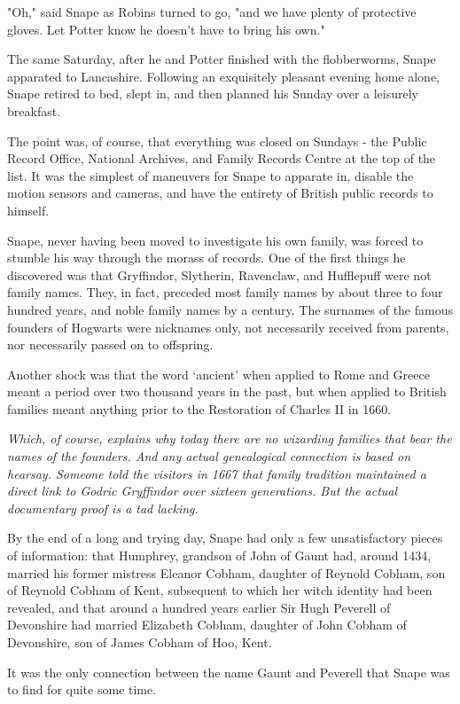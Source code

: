\documentclass[a4paper,11pt]{article}
\begin{document}
"Oh," said Snape as Robins turned to go, "and we have plenty of protective gloves. Let Potter know he doesn't have to bring his own."

The same Saturday, after he and Potter finished with the flobberworms, Snape apparated to Lancashire. Following an exquisitely pleasant evening home alone, Snape retired to bed, slept in, and then planned his Sunday over a leisurely breakfast.

The point was, of course, that everything was closed on Sundays - the Public Record Office, National Archives, and Family Records Centre at the top of the list. It was the simplest of maneuvers for Snape to apparate in, disable the motion sensors and cameras, and have the entirety of British public records to himself.

Snape, never having been moved to investigate his own family, was forced to stumble his way through the morass of records. One of the first things he discovered was that Gryffindor, Slytherin, Ravenclaw, and Hufflepuff were not family names. They, in fact, preceded most family names by about three to four hundred years, and noble family names by a century. The surnames of the famous founders of Hogwarts were nicknames only, not necessarily received from parents, nor necessarily passed on to offspring.

Another shock was that the word `ancient' when applied to Rome and Greece meant a period over two thousand years in the past, but when applied to British families meant anything prior to the Restoration of Charles II in 1660.

\emph{Which, of course, explains why today there are no wizarding families that bear the names of the founders. And any actual genealogical connection is based on hearsay. Someone told the visitors in 1667 that family tradition maintained a direct link to Godric Gryffindor over sixteen generations. But the actual documentary proof is a tad lacking.}

By the end of a long and trying day, Snape had only a few unsatisfactory pieces of information: that Humphrey, grandson of John of Gaunt had, around 1434, married his former mistress Eleanor Cobham, daughter of Reynold Cobham, son of Reynold Cobham of Kent, subsequent to which her witch identity had been revealed, and that around a hundred years earlier Sir Hugh Peverell of Devonshire had married Elizabeth Cobham, daughter of John Cobham of Devonshire, son of James Cobham of Hoo, Kent.

It was the only connection between the name Gaunt and Peverell that Snape was to find for quite some time.
\end{document}
